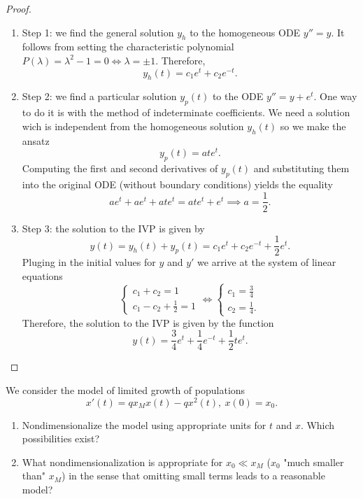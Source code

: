 \begin{proof}$ $ \newline
  \begin{enumerate}
    \item Step 1: we find the general solution $y_h$ to the homogeneous ODE
      $y'' = y$. It follows from setting the characteristic polynomial
      $P(\lambda) = \lambda^2 - 1 = 0 \iff \lambda = \pm 1$. Therefore,
      \[
        y_h(t) = c_1 e^t + c_2 e^{-t}.
      \]
    \item Step 2: we find a particular solution $y_p(t)$ to the ODE $y'' = y +
      e^t$. One way to do it is with the method of indeterminate coefficients.
      We need a solution wich is independent from the homogeneous solution
      $y_h(t)$ so we make the ansatz
      \[
        y_p(t) = a t e^t.
      \]
      Computing the first and second derivatives of $y_p(t)$ and substituting
      them into the original ODE (without boundary conditions) yields the
      equality
      \[
      ae^t + ae^t + ate^t = ate^t + e^t \implies a = \frac{1}{2}.
      \]
    \item Step 3: the solution to the IVP is given by
      \[
        y(t) = y_h(t) + y_p(t) = c_1e^t + c_2e^{-t} + \frac{1}{2} e^t.
      \]
      Pluging in the initial values for $y$ and $y'$ we arrive at the system of
      linear equations
      \[
      \begin{cases}
        c_1 + c_2 = 1\\
        c_1 - c_2 + \frac{1}{2} = 1
      \end{cases}
      \iff
      \begin{cases}
        c_1 = \frac{3}{4} \\
        c_2 = \frac{1}{4}.
      \end{cases}
      \]
      Therefore, the solution to the IVP is given by the function
      \[
        y(t) = \frac{3}{4} e^t + \frac{1}{4} e^{-t} + \frac{1}{2} t e^t.
      \]
  \end{enumerate}
  
\end{proof}


\begin{ex}
  [1.4]
  We consider the model of limited growth of populations
  \[
    x'(t) = qx_M x(t) - q x^2(t),\ x(0) = x_0.
  \]
  \begin{enumerate}
    \item Nondimensionalize the model using appropriate units for $t$ and $x$.
      Which possibilities exist?
    \item What nondimensionalization is appropriate for $x_0 \ll x_M$ ($x_0$
      "much smaller than" $x_M$) in the sense that omitting small terms leads
      to a reasonable model?
  \end{enumerate}
\end{ex}

